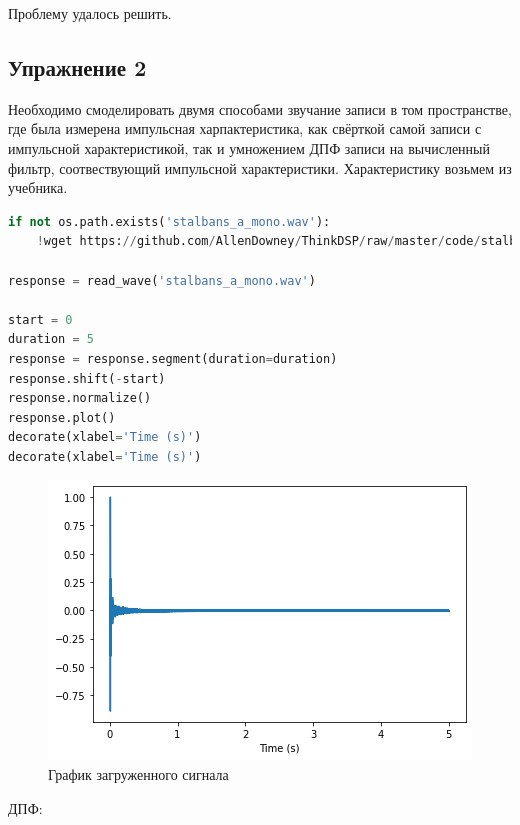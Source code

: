 Проблему удалось решить.

\subsection{Упражнение 2}

Необходимо смоделировать двумя способами звучание записи в том пространстве, где была измерена импульсная харпактеристика, как свёрткой самой записи с импульсной характеристикой, так и умножением ДПФ записи на вычисленный фильтр, соотвествующий импульсной характеристики. Характеристику возьмем из учебника.


\begin{lstlisting}[language=Python]
if not os.path.exists('stalbans_a_mono.wav'):
    !wget https://github.com/AllenDowney/ThinkDSP/raw/master/code/stalbans_a_mono.wav

response = read_wave('stalbans_a_mono.wav')

start = 0
duration = 5
response = response.segment(duration=duration)
response.shift(-start)
response.normalize()
response.plot()
decorate(xlabel='Time (s)')
decorate(xlabel='Time (s)')
\end{lstlisting}
\begin{figure}[H]
	\begin{center}
		\includegraphics[scale=1]{fig/lab10/lab10_5.png}
		\caption{График загруженного сигнала}
	\end{center}
\end{figure}

ДПФ:

